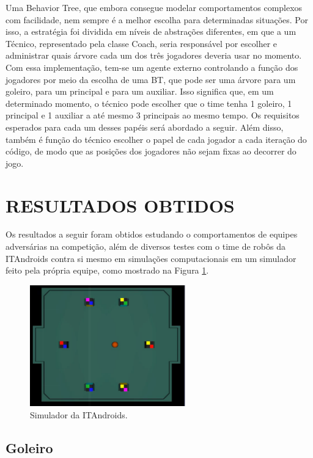 \documentclass[10pt,fleqn,a4paper]{article}
\begin{document}
Uma Behavior Tree, que embora consegue modelar comportamentos complexos com facilidade, nem sempre é a melhor escolha para determinadas situações. Por isso, a estratégia foi dividida em níveis de abstrações diferentes, em que a um Técnico, representado pela classe Coach, seria responsável por escolher e administrar quais árvore cada um dos três jogadores deveria usar no momento.
Com essa implementação, tem-se um agente externo controlando a função dos jogadores por meio da escolha de uma BT, que pode ser uma árvore para um goleiro, para um principal e para um auxiliar. Isso significa que, em um determinado momento, o técnico pode escolher que o time tenha 1 goleiro, 1 principal e 1 auxiliar a até mesmo 3 principais ao mesmo tempo. Os requisitos esperados para cada um desses papéis será abordado a seguir. Além disso, também é função do técnico escolher o papel de cada jogador a cada iteração do código, de modo que as posições dos jogadores não sejam fixas ao decorrer do jogo.

    \section{RESULTADOS OBTIDOS}
        
	Os resultados a seguir foram obtidos estudando o comportamentos de equipes adversárias na competição, além de diversos testes com o time de robôs da ITAndroids contra si mesmo em simulações computacionais em um simulador feito pela própria equipe, como mostrado na Figura \ref{fig:simulator}.

\begin{figure}[H]
	\centering
	\includegraphics[width=0.6\textwidth]{figures/SimulatorWithoutButtons.png}
	\caption{Simulador da ITAndroids.}
	\label{fig:simulator}
\end{figure}

\subsection{Goleiro}
\end{document}

